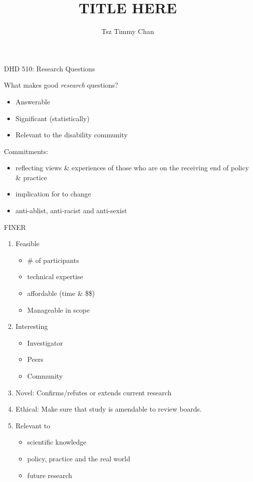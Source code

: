 \documentclass{TC}
\title{TITLE HERE}	%
\author{Tsz Timmy Chan}	%
\begin{document}
DHD 510: Research Questions

What makes good \emph{research} questions?
\begin{itemize}
\item Answerable
\item Significant (statistically)
\item Relevant to the disability community
\end{itemize}


Commitments:
\begin{itemize}
\item reflecting views \& experiences of those who are on the receiving end of policy \& practice

\item implication for to change

\item anti-ablist, anti-racist and anti-sexist
\end{itemize}

\gls{FINER}\parencite{cummings_conceiving_2007}
\begin{multicols}{2}
\begin{enumerate}
\item Feasible
	\begin{itemize}
	\item \# of participants
	\item technical expertise
	\item affordable (time \& \$\$)
	\item Manageable in scope 
	\end{itemize}
\item Interesting
	\begin{itemize}
	\item Investigator
	\item Peers
	\item Community
	\end{itemize}
\item Novel: Confirms/refutes or extends current research
\item Ethical: Make sure that study is amendable to review boards.
\item Relevant to
	\begin{itemize}
	\item scientific knowledge
	\item policy, practice and the real world
	\item future research
	\end{itemize}
\end{enumerate}
\end{multicols}
\end{document}
